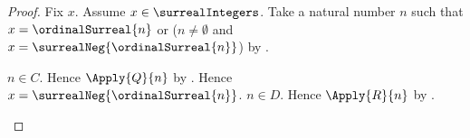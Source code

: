 \begin{proof}
    Fix $x$.
    Assume $x\in\surrealIntegers$.
    Take a natural number $n$ such that
        $x=\ordinalSurreal{n}$ or
        ($n\neq\emptyset$ and
        $x=\surrealNeg{\ordinalSurreal{n}}$)
        by .
    \begin{byCase}
            $n\in C$.
            Hence $\Apply{Q}{n}$
                by .
            Hence $x=\surrealNeg{\ordinalSurreal{n}}$.
            $n\in D$.
            Hence $\Apply{R}{n}$
                by .
    \end{byCase}
\end{proof}
